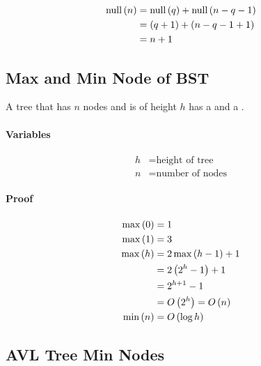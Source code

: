   \begin{align*}
    \operatorname{null} \left( n \right) &= \operatorname{null} \left( q \right) + \operatorname{null} \left( n - q - 1\right) \\ 
    &= \left( q + 1 \right) + \left( n - q - 1 + 1 \right) \\ 
    &= n + 1
  \end{align*}

\subsection{Max and Min Node of BST}

  \begin{theorem}
    A tree that has $ n $ nodes and is of height $ h $ has 
    a 
    and a .
  \end{theorem}
  
  \paragraph{Variables}

  \begin{align*}
    h &= \text{height of tree} \\
    n &= \text{number of nodes}
  \end{align*}
  
  \paragraph{Proof}
  
  \begin{align*}
    \operatorname{max} \left( 0 \right) &= 1 \\ 
    \operatorname{max} \left( 1 \right) &= 3 \\ 
    \operatorname{max} \left( h \right) &= 2 \operatorname{max} \left( h - 1 \right) + 1 \\ 
    &= 2 \left( 2^{h} - 1 \right) + 1 \\ 
    &= 2^{h + 1} - 1 \\
    &= O \left( 2^{h} \right) = O \left( n \right) \\
    \operatorname{min} \left( n \right) &= O \left( \log h \right)
  \end{align*}
  
\subsection{AVL Tree Min Nodes}

